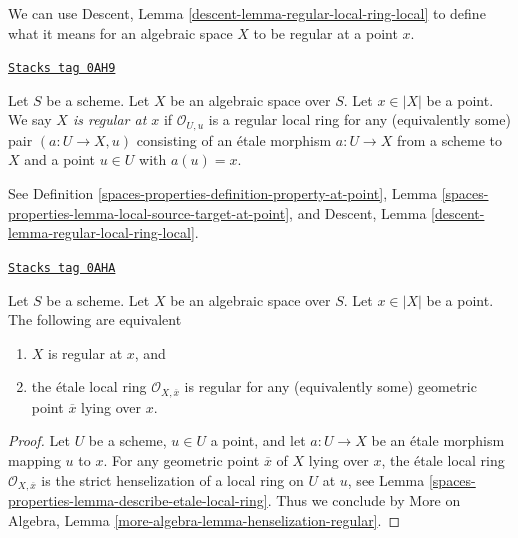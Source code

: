 We can use Descent, Lemma \ref{descent-lemma-regular-local-ring-local}
to define what it means for an algebraic space $X$ to be regular at a
point $x$.

\begin{definition}
\label{spaces-properties-definition-regular-at-point}
\href{https://stacks.math.columbia.edu/tag/0AH9}{\texttt{Stacks tag 0AH9}}

Let $S$ be a scheme. Let $X$ be an algebraic space over $S$.
Let $x \in |X|$ be a point. We say {\it $X$ is regular at $x$}
if $\mathcal{O}_{U, u}$ is a regular local ring for any
(equivalently some) pair $(a : U \to X, u)$ consisting of an
\'etale morphism $a : U \to X$ from a scheme to $X$ and a point
$u \in U$ with $a(u) = x$.
\end{definition}

See Definition \ref{spaces-properties-definition-property-at-point},
Lemma \ref{spaces-properties-lemma-local-source-target-at-point}, and
Descent, Lemma \ref{descent-lemma-regular-local-ring-local}.

\begin{lemma}[Regular at x]
\label{spaces-properties-lemma-regular-at-x}
\href{https://stacks.math.columbia.edu/tag/0AHA}{\texttt{Stacks tag 0AHA}}

Let $S$ be a scheme. Let $X$ be an algebraic space over $S$.
Let $x \in |X|$ be a point. The following are equivalent
\begin{enumerate}
\item $X$ is regular at $x$, and
\item the \'etale local ring $\mathcal{O}_{X, \overline{x}}$ is
regular for any (equivalently some) geometric point $\overline{x}$
lying over $x$.
\end{enumerate}
\end{lemma}

\begin{proof}
Let $U$ be a scheme, $u \in U$ a point, and let $a : U \to X$ be an
\'etale morphism mapping $u$ to $x$. For any geometric point
$\overline{x}$ of $X$ lying over $x$, the \'etale local
ring $\mathcal{O}_{X, \overline{x}}$ is the strict henselization of
a local ring on $U$ at $u$, see
Lemma \ref{spaces-properties-lemma-describe-etale-local-ring}.
Thus we conclude by
More on Algebra, Lemma \ref{more-algebra-lemma-henselization-regular}.
\end{proof}

